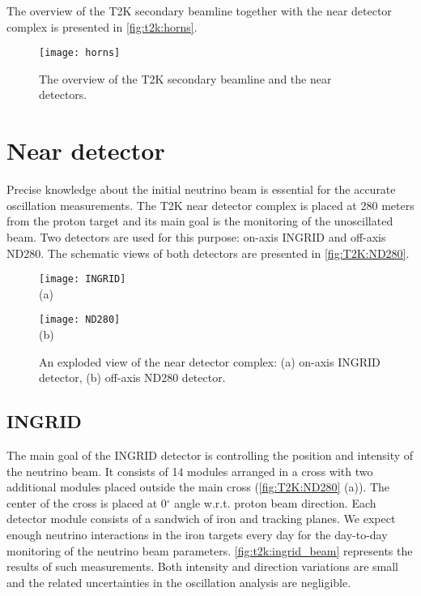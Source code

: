 \documentclass[../main.tex]{subfiles}
\begin{document}
The overview of the T2K secondary beamline together with the near detector complex is presented in \autoref{fig:t2k:horns}.

\begin{figure}[!ht]
  \centering
  \texttt{[image: horns]}
  \caption{The overview of the T2K secondary beamline and the near detectors.}
  \label{fig:t2k:horns}
\end{figure}

\section{Near detector}
\label{sec:T2K:nd}
Precise knowledge about the initial neutrino beam is essential for the accurate oscillation measurements. The T2K near detector complex is placed at 280 meters from the proton target and its main goal is the monitoring of the unoscillated beam. Two detectors are used for this purpose: on-axis INGRID and off-axis ND280. The schematic views of both detectors are presented in \autoref{fig:T2K:ND280}.

\begin{figure}[!ht]
  \centering
  \begin{minipage}{0.49\linewidth}
    \centering
    \texttt{[image: INGRID]} \\ (a)
  \end{minipage}
  \begin{minipage}{0.49\linewidth}
    \centering
    \texttt{[image: ND280]} \\ (b)
  \end{minipage}
    \caption{An exploded view of the near detector complex: (a) on-axis INGRID detector, (b) off-axis ND280 detector.}
    \label{fig:T2K:ND280}
\end{figure}

\subsection{INGRID}
The main goal of the INGRID detector is controlling the position and intensity of the neutrino beam. It consists of 14 modules arranged in a cross with two additional modules placed outside the main cross (\autoref{fig:T2K:ND280} (a)). The center of the cross is placed at 0$^\circ$ angle w.r.t. proton beam direction. Each detector module consists of a sandwich of iron and tracking planes. We expect enough neutrino interactions in the iron targets every day for the day-to-day monitoring of the neutrino beam parameters. \autoref{fig:t2k:ingrid_beam} represents the results of such measurements. Both intensity and direction variations are small and the related uncertainties in the oscillation analysis are negligible.
\end{document}

